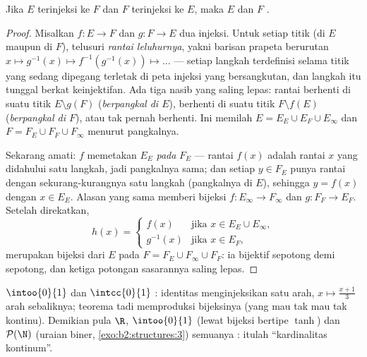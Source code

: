 \begin{theorem}\label{thm:b2:structures:cantorbernstein}
Jika $E$ terinjeksi ke $F$ dan $F$ terinjeksi ke $E$, maka $E$ dan $F$
.
\end{theorem}

\begin{proof}
Misalkan $f \colon E \to F$ dan $g \colon F \to E$ dua injeksi. Untuk
setiap titik (di $E$ maupun di $F$), telusuri \emph{rantai leluhurnya},
yakni barisan prapeta berurutan $x \mapsto g^{-1}(x) \mapsto
f^{-1}(g^{-1}(x)) \mapsto \dots$ --- setiap langkah terdefinisi selama
titik yang sedang dipegang terletak di peta injeksi yang bersangkutan,
dan langkah itu tunggal berkat keinjektifan. Ada tiga nasib yang saling
lepas: rantai berhenti di suatu titik $E \setminus g(F)$ (\emph{berpangkal
di $E$}), berhenti di suatu titik $F \setminus f(E)$ (\emph{berpangkal di
$F$}), atau tak pernah berhenti. Ini memilah $E = E_E \cup E_F \cup
E_\infty$ dan $F = F_E \cup F_F \cup F_\infty$ menurut pangkalnya.

Sekarang amati: $f$ memetakan $E_E$ \emph{pada} $F_E$ --- rantai
$f(x)$ adalah rantai $x$ yang didahului satu langkah, jadi pangkalnya
sama; dan setiap $y \in F_E$ punya rantai dengan sekurang-kurangnya satu
langkah (pangkalnya di $E$), sehingga $y = f(x)$ dengan $x \in E_E$.
Alasan yang sama memberi bijeksi $f \colon E_\infty \to F_\infty$ dan $g
\colon F_F \to E_F$. Setelah direkatkan,
\[
h(x) =
\begin{cases}
f(x) & \text{jika } x \in E_E \cup E_\infty,\\
g^{-1}(x) & \text{jika } x \in E_F,
\end{cases}
\]
merupakan bijeksi dari $E$ pada $F = F_E \cup F_\infty \cup F_F$: ia
bijektif sepotong demi sepotong, dan ketiga potongan sasarannya saling lepas.
\end{proof}

\begin{example}\label{ex:b2:structures:cbexample}
$\intoo{0}{1}$ dan $\intcc{0}{1}$ : identitas menginjeksikan
satu arah, $x \mapsto \frac{x + 1}{3}$ arah sebaliknya; teorema tadi
memproduksi bijeksinya (yang mau tak mau tak kontinu). Demikian pula
$\R$, $\intoo{0}{1}$ (lewat bijeksi bertipe $\tanh$) dan
$\mathcal{P}(\N)$ (uraian biner, \cref{exo:b2:structures:3})
semuanya : itulah ``kardinalitas kontinum''.
\end{example}

